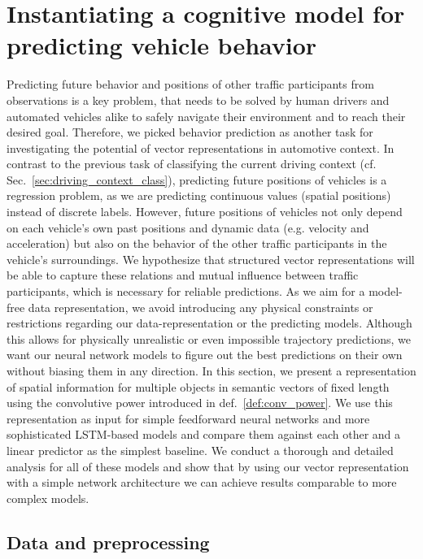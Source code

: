 \chapter{Instantiating a cognitive model for predicting vehicle behavior}
\label{chap:behav_pred}

Predicting future behavior and positions of other traffic participants from observations is a key problem, that needs to be solved by human drivers and automated vehicles alike to safely navigate their environment and to reach their desired goal.
Therefore, we picked behavior prediction as another task for investigating the potential of vector representations in automotive context.
In contrast to the previous task of classifying the current driving context (cf. Sec.~\ref{sec:driving_context_class}), predicting future positions of vehicles is a regression problem, as we are predicting continuous values (spatial positions) instead of discrete labels.
However, future positions of vehicles not only depend on each vehicle's own past positions and dynamic data (e.g. velocity and acceleration) but also on the behavior of the other traffic participants in the vehicle's surroundings.
We hypothesize that structured vector representations will be able to capture these relations and mutual influence between traffic participants, which is necessary for reliable predictions.
As we aim for a model-free data representation, we avoid introducing any physical constraints or restrictions regarding our data-representation or the predicting models.
Although this allows for physically unrealistic or even impossible trajectory predictions, we want our neural network models to figure out the best predictions on their own without biasing them in any direction.
In this section, we present a representation of spatial information for multiple objects in semantic vectors of fixed length using the convolutive power introduced in def.~\ref{def:conv_power}. 
We use this representation as input for simple feedforward neural networks and more sophisticated \ac{LSTM}-based models and compare them against each other and a linear predictor as the simplest baseline.
We conduct a thorough and detailed analysis for all of these models and show that by using our vector representation with a simple network architecture we can achieve results comparable to more complex models.

\section{Data and preprocessing}
\label{sec:data_preproc}


